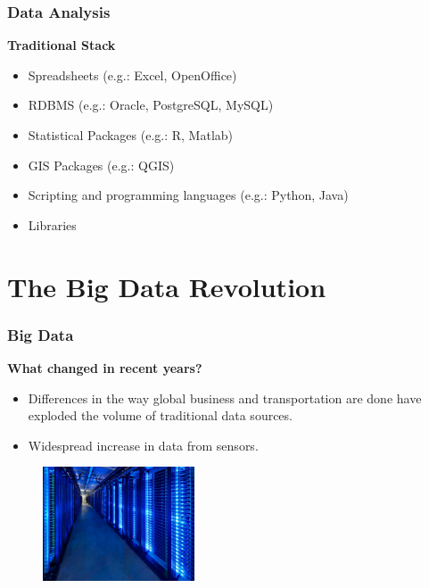 \documentclass[hyperref={pdfpagelabels=true}]{beamer}
\begin{document}
\begin{frame}
\frametitle{Data Analysis}
\textbf{Traditional Stack}
    \begin{itemize}
      \item Spreadsheets (e.g.: Excel, OpenOffice)
      \item RDBMS (e.g.: Oracle, PostgreSQL, MySQL)
      \item Statistical Packages (e.g.: R, Matlab)
      \item GIS Packages (e.g.: QGIS)      
      \item Scripting and programming languages (e.g.: Python, Java)
      \item Libraries      
      \end{itemize}  
\end{frame}

\section{The Big Data Revolution}
\begin{frame}
\frametitle{Big Data}
\textbf{What changed in recent years?}
   \begin{itemize}
      \item Differences in the way global business and transportation are done have exploded the volume of traditional data sources.%
      \item Widespread increase in data from sensors. %
      \end{itemize}
      \vspace{5mm}
    \begin{figure}       
	\includegraphics[width=0.4\textwidth]{cluster.jpg}      
     \end{figure}
\end{frame}
\end{document}
